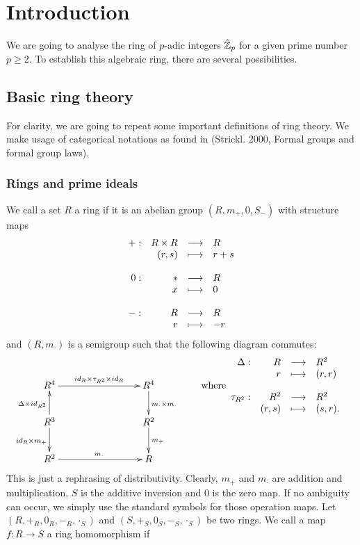\section{Introduction}
We are going to analyse the ring of $p$-adic integers $\hat{\zz}_p$ for a given prime number $p \geq 2$. To establish this algebraic ring, there are several possibilities.
\subsection{Basic ring theory}
For clarity, we are going to repeat some important definitions of ring theory. We make usage of categorical notations as found in (Strickl. 2000, Formal groups and formal group laws).
\subsubsection{Rings and prime ideals}
We call a set $R$ a ring if it is an abelian group $(R,m_+,0,S_-)$ with structure maps
$$\bao{rrcl}
+ :& R \times R&\longrightarrow& R\\
&(r,s) &\longmapsto&r + s\\
&&&\\
0 :& \ast & \longrightarrow&R\\
&x&\longmapsto&0\\
&&&\\
- :& R &\longrightarrow&R\\
&r &\longmapsto&-r\\
\ea$$
and $(R,m_\cdot)$ is a semigroup such that the following diagram commutes:
$$\bao{cc}\xymatrix{
R^4 \ar[rrr]^{id_R \times \tau_{R^2} \times id_R} &&& R^4 \ar[d]^{m_\cdot \times m_\cdot}&\\
R^3 \ar[d]_{id_R \times m_+} \ar[u]^{\Delta \times id_{R^2}} &&&R^2\ar[d]^{m_+}\\
R^2\ar[rrr]^{m_\cdot}&&&R\\
} & \bao{c}
\trm{where}\bao{rrcl}
\Delta : & R & \longrightarrow& R^2\\
&r&\longmapsto&(r,r)\\
&&&\\
\tau_{R^2} :& R^2 &\longrightarrow&R^2\\
&(r,s)&\longmapsto&(s,r).\\
\ea\ea
\ea$$
This is just a rephrasing of distributivity. Clearly, $m_+$ and $m_\cdot$ are addition and multiplication, $S$ is the additive inversion and $0$ is the zero map. If no ambiguity can occur, we simply use the standard symbols for those operation maps.  Let $(R,+_R, 0_R, -_R,\cdot_S)$ and $(S,+_S,0_S,-_S,\cdot_S)$ be two rings. We call a map $f : R \longrightarrow S$ a ring homomorphism if
